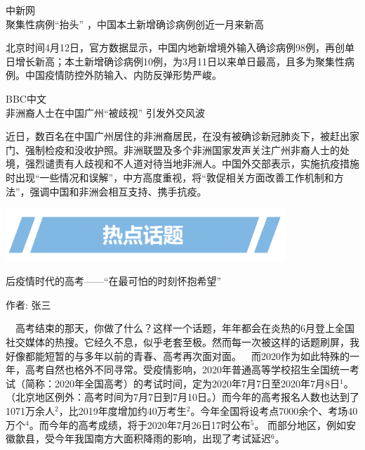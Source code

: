 \documentclass[]{article}
\begin{document}
\begin{center}
\textcolor{glaucous}{中新网}\\聚集性病例“抬头” ，中国本土新增确诊病例创近一月来新高
\end{center}

北京时间4月12日，官方数据显示，中国内地新增境外输入确诊病例98例，再创单日增长新高；本土新增确诊病例10例，为3月11日以来单日最高，且多为聚集性病例。中国疫情防控外防输入、内防反弹形势严峻。

\begin{center}
\textcolor{glaucous}{BBC中文}\\非洲裔人士在中国广州“被歧视” 引发外交风波
\end{center}

近日，数百名在中国广州居住的非洲裔居民，在没有被确诊新冠肺炎下，被赶出家门、强制检疫和没收护照。非洲联盟及多个非洲国家发声关注广州非裔人士的处境，强烈谴责有人歧视和不人道对待当地非洲人。中国外交部表示，实施抗疫措施时出现``一些情况和误解''，中方高度重视，将``敦促相关方面改善工作机制和方法''，强调中国和非洲会相互支持、携手抗疫。

\vspace{15mm}

\begin{center}
\includegraphics[height=2cm]{./input/title3.png} 
\end{center}
\vspace{-7mm}

\vspace{5mm}

\begin{center}
\textcolor{glaucous}{\Huge 后疫情时代的高考——“在最可怕的时刻怀抱希望”
}
\end{center}

\vspace{-3mm}

\begin{center}
作者: 张三
\end{center}

\(\quad\)高考结束的那天，你做了什么？这样一个话题，年年都会在炎热的6月登上全国社交媒体的热搜。它经久不息，似乎老套至极。然而每一次被这样的话题刷屏，我好像都能短暂的与多年以前的青春、高考再次面对面。\(\quad\)而2020作为如此特殊的一年，高考自然也格外不同寻常。受疫情影响，2020年普通高等学校招生全国统一考试（简称：2020年全国高考）的考试时间，定为2020年7月7日至2020年7月8日\(^1\)。（北京地区例外：高考时间为7月7日到7月10日。）而今年的高考报名人数也达到了1071万余人\(^2\)，比2019年度增加约40万考生\(^2\)。今年全国将设考点7000余个、考场40万个\(^4\)。而今年的高考成绩，将于2020年7月26日17时公布\(^5\)。
而部分地区，例如安徽歙县，受今年我国南方大面积降雨的影响，出现了考试延迟\(^6\)。
\end{document}
